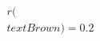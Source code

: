 \documentclass[preview]{standalone}
\begin{document}
\begin{align*}
r(\\textBrown) = 0.2
\end{align*}
\end{document}
